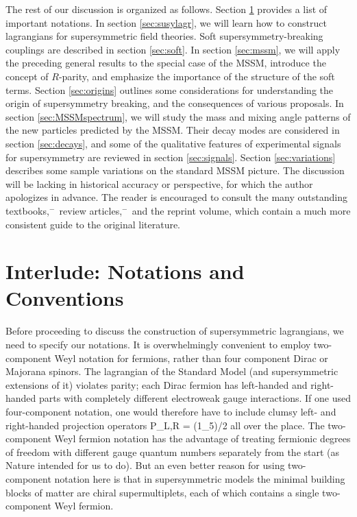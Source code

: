 The rest of our discussion is organized as follows.
Section \ref{sec:notations} provides a list of important notations.
In section \ref{sec:susylagr}, we will learn how to
construct lagrangians for
supersymmetric field theories. Soft supersymmetry-breaking couplings
are described in section \ref{sec:soft}. In section \ref{sec:mssm},
we will apply the preceding general results to the special case
of the MSSM, introduce the concept of $R$-parity, and emphasize the
importance of the structure of the soft terms. Section
\ref{sec:origins} outlines some considerations for understanding
the origin of supersymmetry breaking, and the consequences of various
proposals. In section \ref{sec:MSSMspectrum}, we will study the mass and
mixing angle patterns of the new particles predicted by the MSSM.
Their decay modes are considered in section \ref{sec:decays},
and some of the qualitative features of experimental signals
for supersymmetry are reviewed in section \ref{sec:signals}. Section
\ref{sec:variations} describes some sample variations on the standard MSSM
picture. The discussion
will be lacking in historical accuracy or
perspective, for which the author apologizes in advance. The
reader is encouraged to consult the many outstanding
textbooks,\cite{WessBaggerbook}$^{\!-\,}$\cite{Ramondbook}
review articles,\cite{HaberKanereview}$^{\!-\,}$\cite{Tatareview}
and the reprint volume,\cite{reprints}
which contain a much more consistent guide to the original literature.

\section{Interlude: Notations and Conventions}\label{sec:notations}
\setcounter{equation}{0}
\setcounter{footnote}{1}

Before proceeding to discuss the construction of supersymmetric
lagrangians, we need to specify our notations. It is
overwhelmingly convenient to employ two-component Weyl notation
for fermions, rather than four component Dirac or Majorana spinors.
The lagrangian of the Standard Model (and supersymmetric extensions
of it) violates parity; each Dirac fermion has
left-handed and right-handed parts with
completely different electroweak gauge interactions.
If one used four-component notation, one would therefore
have to include clumsy left- and right-handed projection operators
\beq
P_{L,R} = (1\pm \gamma_5)/2
\eeq
all over the place. The two-component Weyl fermion notation has the
advantage of treating fermionic degrees of freedom with
different gauge quantum numbers separately from the start (as Nature
intended for us to do).
But an even better reason for using two-component notation
here is that in supersymmetric models the minimal building blocks of
matter are chiral supermultiplets, each of which
contains a single two-component Weyl fermion.

